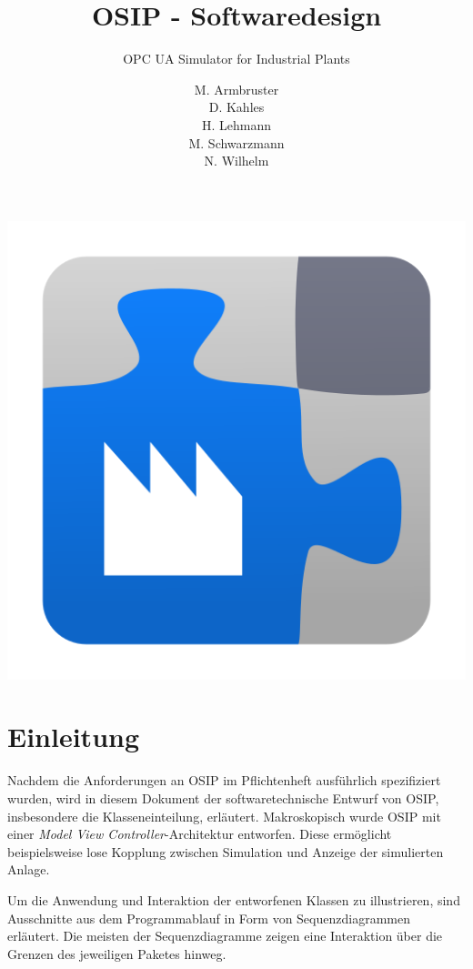 \documentclass[parskip=full]{scrartcl}
\title{OSIP - Softwaredesign}
\subtitle{OPC UA Simulator for Industrial Plants}
\author{
    M. Armbruster\\
    D. Kahles\\
    H. Lehmann\\
    M. Schwarzmann\\
    N. Wilhelm
}
\begin{document}
\maketitle

\vspace{20px}
\begin{center}
  \includegraphics[scale=0.4]{../icon.png}
\end{center}
\pagebreak
\tableofcontents
\pagebreak

\section{Einleitung}
Nachdem die Anforderungen an OSIP im Pflichtenheft ausführlich spezifiziert wurden, wird in diesem Dokument
der softwaretechnische Entwurf von OSIP, insbesondere die Klasseneinteilung, erläutert. Makroskopisch wurde OSIP
mit einer \emph{Model View Controller}-Architektur entworfen. Diese ermöglicht beispielsweise
lose Kopplung zwischen Simulation und Anzeige der simulierten Anlage.

Um die Anwendung und Interaktion der entworfenen Klassen zu illustrieren, sind Ausschnitte aus dem Programmablauf
in Form von Sequenzdiagrammen erläutert. Die meisten der Sequenzdiagramme zeigen eine Interaktion über die Grenzen
des jeweiligen Paketes hinweg.
\end{document}
